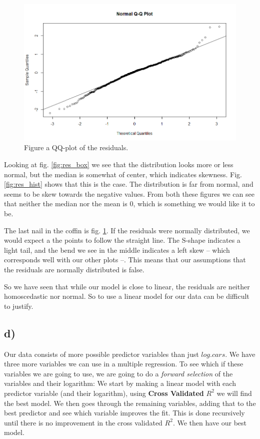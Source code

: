 \documentclass[a4paper,norsk, 10pt]{article}
\begin{document}
\begin{figure}[!htbp]
\centering
\includegraphics[scale=0.5]{res_qq.png}
\caption{Figure a QQ-plot of the residuals.}\label{fig:res_qq}
\end{figure}


Looking at fig. \ref{fig:res_box} we see that the distribution looks more or less normal, but the median is somewhat of center, which indicates skewness. Fig. \ref{fig:res_hist} shows that this is the case. The distribution is far from normal, and seems to be skew towards the negative values. From both these figures we can see that neither the median nor the mean is $0$, which is something we would like it to be.

The last nail in the coffin is fig. \ref{fig:res_qq}. If the residuals were normally distributed, we would expect a the points to follow the straight line. The S-shape indicates a light tail, and the bend we see in the middle indicates a left skew -- which corresponds well with our other plots --. This means that our assumptions that the residuals are normally distributed is false.


So we have seen that while our model is close to linear, the residuals are neither homoscedastic nor normal. So to use a linear model for our data can be difficult to justify.



\subsection*{d)}

Our data consists of more possible predictor variables than just $log.cars$. We have three more variables we can use in a multiple regression. To see which if these variables we are going to use, we are going to do a \textit{forward selection} of the variables and their logarithm: We start by making a linear model with each predictor variable (and their logarithm), using \textbf{Cross Validated} $R^2$ we will find the best model. We then goes through the remaining variables, adding that to the best predictor and see which variable improves the fit. This is done recursively until there is no improvement in the cross validated $R^2$. We then have our best model. 
\end{document}
